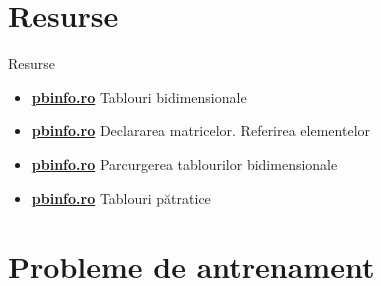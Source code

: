 ﻿\documentclass{beamer}
\begin{document}
\section{Resurse}

\begin{frame}{Resurse}
  \begin{itemize}\itemsep6pt
    \item \href{https://www.pbinfo.ro/articole/5620/tablouri-bidimensionale}{\textbf{pbinfo.ro}} \textemdash{} Tablouri bidimensionale
    \item \href{https://www.pbinfo.ro/articole/5622/declararea-matricelor-referirea-elementelor}{\textbf{pbinfo.ro}} \textemdash{} Declararea matricelor. Referirea elementelor
    \item \href{https://www.pbinfo.ro/articole/5623/parcurgerea-tablourilor-bidimensionale}{\textbf{pbinfo.ro}} \textemdash{} Parcurgerea tablourilor bidimensionale
    \item \href{https://www.pbinfo.ro/articole/5626/tablouri-patratice}{\textbf{pbinfo.ro}} \textemdash{} Tablouri pătratice
  \end{itemize}
\end{frame}

\section{Probleme de antrenament}
\end{document}

